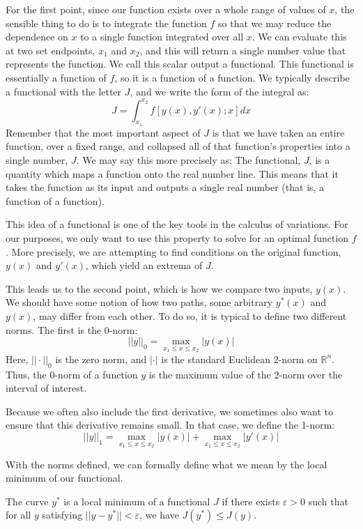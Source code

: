 For the first point, since our function exists over a whole range of values of $x$, the sensible thing to do is to integrate the function $f$ so that we may reduce the dependence on $x$ to a single function integrated over all $x$. We can evaluate this at two set endpoints, $x_1$ and $x_2$, and this will return a single number value that represents the function. We call this scalar output a \gls{functional}. This \gls{functional} is essentially a function of $f$, so it is a function of a function. We typically describe a functional with the letter $J$, and we write the form of the integral as:
\begin{equation}\label{eq:functional}
    J=\int_{x_1}^{x_2}f\left[y(x),y'(x);x\right]{dx}
\end{equation}
Remember that the most important aspect of $J$ is that we have taken an entire function, over a fixed range, and collapsed all of that function's properties into a single number, $J$. We may say this more precisely as: The \gls{functional}, $J$, is a quantity which maps a function onto the real number line. This means that it takes the function as its input and outputs a single real number (that is, a function of a function). 

This idea of a functional is one of the key tools in the calculus of variations. For our purposes, we only want to use this property to solve for an optimal function $f$. More precisely, we are attempting to find conditions on the original function, $y(x)$ and $y'(x)$, which yield an extrema of $J$. 

This leads us to the second point, which is how we compare two inputs, $y(x)$. We should have some notion of how two paths, some arbitrary $y^*(x)$ and $y(x)$, may differ from each other. To do so, it is typical to define two different norms. The first is the $0$-norm:
$$||y||_0=\max_{x_1\le x\le x_2}|y(x)|$$
Here, $||\cdot||_0$ is the zero norm, and $|\cdot|$ is the standard Euclidean $2$-norm on $\mathbb{R}^n$. Thus, the 0-norm of a function $y$ is the maximum value of the $2$-norm over the interval of interest. 

Because we often also include the first derivative, we sometimes also want to ensure that this derivative remains small. In that case, we define the 1-norm:
$$||y||_1=\max_{x_1\le x\le x_2}|y(x)|+\max_{x_1\le x\le x_2}|y'(x)|$$

With the norms defined, we can formally define what we mean by the local minimum of our functional.

\begin{definition}

The curve $y^*$ is a local minimum of a functional $J$ if there exists $\varepsilon>0$ such that for all $y$ satisfying $||y-y^*||<\varepsilon$, we have $J(y^*)\leq J(y)$.
\end{definition}

